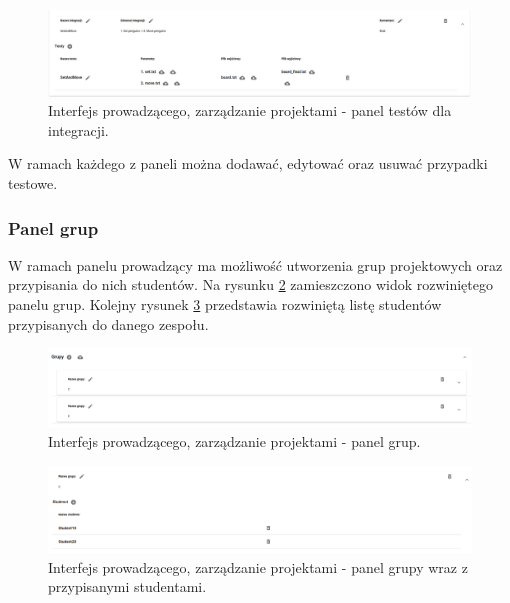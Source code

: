 \begin{figure}[h]
    \centering
    \includegraphics[width = 15cm]{chapter04/lecturer_integrations_tests.png}
    \caption{Interfejs prowadzącego, zarządzanie projektami - panel testów dla integracji.}
    \label{fig:lecturer_integrations_tests}
\end{figure}

W ramach każdego z paneli można dodawać, edytować oraz usuwać przypadki testowe.

\subsubsection{Panel grup}

W ramach panelu prowadzący ma możliwość utworzenia grup projektowych oraz przypisania do nich studentów.
Na rysunku \ref{fig:lecturer_groups} zamieszczono widok rozwiniętego panelu grup.
Kolejny rysunek \ref{fig:lecturer_students_in_group} przedstawia rozwiniętą listę studentów przypisanych do danego zespołu.

\begin{figure}[h]
    \centering
    \includegraphics[width = 13cm]{chapter04/lecturer_groups.png}
    \caption{Interfejs prowadzącego, zarządzanie projektami - panel grup.}
    \label{fig:lecturer_groups}
\end{figure}

\begin{figure}[h]
    \centering
    \includegraphics[width = 13cm]{chapter04/lecturer_students_in_group.png}
    \caption{Interfejs prowadzącego, zarządzanie projektami - panel grupy wraz z przypisanymi studentami.}
    \label{fig:lecturer_students_in_group}
\end{figure}

